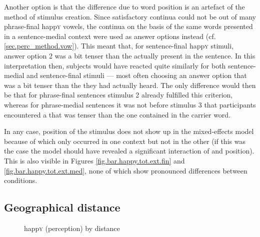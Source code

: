 Another option is that the difference due to word position is an artefact of the method of stimulus creation.
Since satisfactory continua could not be  out of many phrase-final happ\textsc{y} vowels, the continua  on the basis of the same words presented in a sentence-medial context were used as answer options instead (cf. \ref{sec.perc_method.vow}).
This meant that, for sentence-final happ\textsc{y} stimuli, answer option 2 was a bit tenser than the  actually present in the sentence.
In this interpretation then, subjects would have reacted quite similarly for both sentence-medial and sentence-final stimuli --- most often choosing an answer option that was a bit tenser than the  they had actually heard.
The only difference would then be that for phrase-final sentences stimulus 2 already fulfilled this criterion, whereas for phrase-medial sentences it was not before stimulus 3 that participants encountered a  that was tenser than the one contained in the carrier word.

In any case, position of the stimulus does not show up in the mixed-effects model because of  which only occurred in one context but not in the other (if this was the case the model should have revealed a significant interaction of  and position).
This is also visible in Figures \ref{fig.bar.happy.tot.ext.fin} and \ref{fig.bar.happy.tot.ext.med}, none of which show pronounced differences between  conditions.

\subsection{Geographical distance}
\label{sec.perc_res.happy.geography}

\begin{figure}[h]
	\centering
		\resizebox{.49\linewidth}{!}{} 
	\caption{happ\textsc{y} (perception) by distance}
	\label{fig.scatter.happy.ext.dist}
\end{figure}

